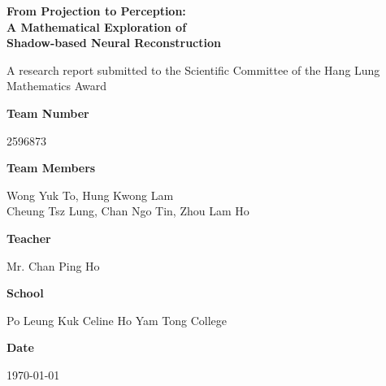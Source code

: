 \documentclass[12pt,a4paper]{article}
\theoremstyle{definition}
\newcommand{\R}{\mathbb{R}}
\begin{document}
\begin{titlepage}
    \centering
    \vspace*{1cm}
    {\huge \textbf{From Projection to Perception: \\ A Mathematical Exploration of \\ Shadow-based Neural Reconstruction}\par}
    \vspace{1.5cm}
    {\normalsize
    A research report submitted to the Scientific Committee of the Hang Lung Mathematics Award\par}
    \vspace{1cm}
    {\normalsize \textbf{Team Number}\par 2596873\par}
    \vspace{0.5cm}
    {\normalsize \textbf{Team Members}\par Wong Yuk To, Hung Kwong Lam \\ Cheung Tsz Lung, Chan Ngo Tin, Zhou Lam Ho\par}
    \vspace{0.5cm}
    {\normalsize \textbf{Teacher}\par Mr. Chan Ping Ho\par}
    \vspace{0.5cm}
    {\normalsize \textbf{School}\par Po Leung Kuk Celine Ho Yam Tong College\par}
    \vspace{0.5cm}
    {\normalsize \textbf{Date}\par \today\par}
    \vfill

    \begin{abstract}
    \noindent
    This paper explores \textsc{ShadowNeuS} \hyperlink{[LWX23]}{[LWX23]}, a neural network that reconstructs 3D geometry from single-view camera images using shadow and light cues. Unlike traditional 3D reconstruction methods relying on multi-view cameras or sensors, \textsc{ShadowNeuS} leverages a neural signed distance field (SDF) for accurate 3D geometry reconstruction. We analyze the training process and uncover its connections to projective geometry, spatial reasoning in $\R^3$, and the neural network's learned geometric representation of space.
    \end{abstract}
\end{titlepage}

\tableofcontents
\newpage
\end{document}
